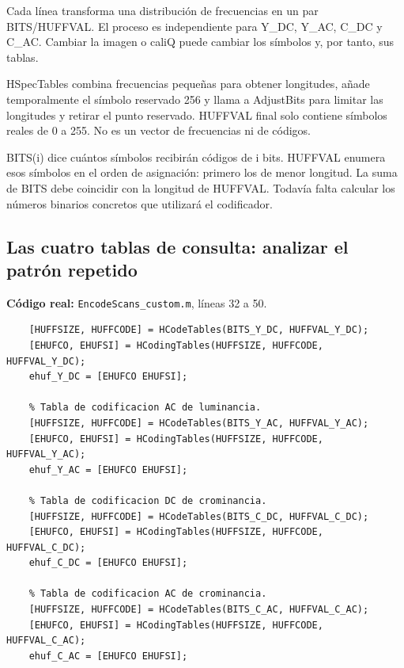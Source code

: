 \documentclass[11pt,a4paper,oneside]{report}
\begin{document}
Cada línea transforma una distribución de frecuencias en un par BITS/HUFFVAL.
El proceso es independiente para Y\_DC, Y\_AC, C\_DC y C\_AC. Cambiar la imagen
o caliQ puede cambiar los símbolos y, por tanto, sus tablas.

HSpecTables combina frecuencias pequeñas para obtener longitudes, añade
temporalmente el símbolo reservado 256 y llama a AdjustBits para limitar
las longitudes y retirar el punto reservado. HUFFVAL final solo contiene
símbolos reales de 0 a 255. No es un vector de frecuencias ni de códigos.

BITS(i) dice cuántos símbolos recibirán códigos de i bits. HUFFVAL enumera
esos símbolos en el orden de asignación: primero los de menor longitud.
La suma de BITS debe coincidir con la longitud de HUFFVAL. Todavía falta
calcular los números binarios concretos que utilizará el codificador.


\par\medskip\noindent\begin{minipage}{\linewidth}

\subsection{Las cuatro tablas de consulta: analizar el patrón repetido}

\textbf{Código real:} \texttt{EncodeScans\_custom.m}, líneas 32 a 50.

\begin{lstlisting}[firstnumber=32]
    % Tabla de codificacion DC de luminancia.
    [HUFFSIZE, HUFFCODE] = HCodeTables(BITS_Y_DC, HUFFVAL_Y_DC);
    [EHUFCO, EHUFSI] = HCodingTables(HUFFSIZE, HUFFCODE, HUFFVAL_Y_DC);
    ehuf_Y_DC = [EHUFCO EHUFSI];

    % Tabla de codificacion AC de luminancia.
    [HUFFSIZE, HUFFCODE] = HCodeTables(BITS_Y_AC, HUFFVAL_Y_AC);
    [EHUFCO, EHUFSI] = HCodingTables(HUFFSIZE, HUFFCODE, HUFFVAL_Y_AC);
    ehuf_Y_AC = [EHUFCO EHUFSI];

    % Tabla de codificacion DC de crominancia.
    [HUFFSIZE, HUFFCODE] = HCodeTables(BITS_C_DC, HUFFVAL_C_DC);
    [EHUFCO, EHUFSI] = HCodingTables(HUFFSIZE, HUFFCODE, HUFFVAL_C_DC);
    ehuf_C_DC = [EHUFCO EHUFSI];

    % Tabla de codificacion AC de crominancia.
    [HUFFSIZE, HUFFCODE] = HCodeTables(BITS_C_AC, HUFFVAL_C_AC);
    [EHUFCO, EHUFSI] = HCodingTables(HUFFSIZE, HUFFCODE, HUFFVAL_C_AC);
    ehuf_C_AC = [EHUFCO EHUFSI];
\end{lstlisting}

\end{minipage}\par
\end{document}
